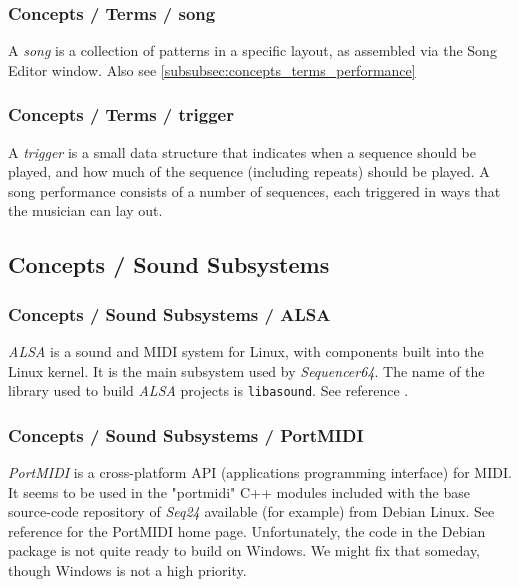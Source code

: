 \subsubsection{Concepts / Terms / song}
\label{subsubsec:concepts_terms_song}

   A \textsl{song} is a collection of patterns in a specific layout, as
   assembled via the Song Editor window.
   Also see \ref{subsubsec:concepts_terms_performance}

\subsubsection{Concepts / Terms / trigger}
\label{subsubsec:concepts_terms_trigger}

   A \textsl{trigger} is a small data structure that indicates when a sequence
   should be played, and how much of the sequence (including repeats) should be
   played.  A song performance consists of a number of sequences, each
   triggered in ways that the musician can lay out.

\subsection{Concepts / Sound Subsystems}
\label{subsec:concepts_sound_subsystems}

\subsubsection{Concepts / Sound Subsystems / ALSA}
\label{subsubsec:concepts_sound_alsa}

   \textsl{ALSA} is a sound and MIDI system for Linux, with components built
   into the Linux kernel. It is the main subsystem used by
   \textsl{Sequencer64}.  The name of the library used to build
   \textsl{ALSA} projects is \texttt{libasound}.
   See reference \cite{alsa}.

\subsubsection{Concepts / Sound Subsystems / PortMIDI}
\label{subsubsec:concepts_sound_portmidi}

   \textsl{PortMIDI} is a cross-platform API (applications programming
   interface) for MIDI.  It seems to be used in the "portmidi" C++ modules
   included with the base source-code repository of \textsl{Seq24} available
   (for example) from Debian Linux.  See reference \cite{portmidi}
   for the PortMIDI home page.  Unfortunately, the code in the Debian
   package is not quite ready to build on Windows.  We might fix that
   someday, though Windows is not a high priority.

